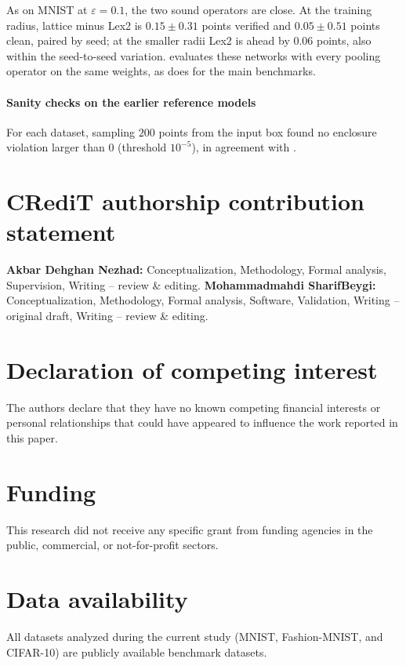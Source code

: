 \documentclass[preprint,12pt]{elsarticle}
\theoremstyle{definition}
\newcommand{\eps}{\varepsilon}
\begin{document}
As on MNIST at $\eps=0.1$, the two sound operators are close. At the training radius, lattice minus Lex2 is $0.15\pm0.31$ points verified and $0.05\pm0.51$ points clean, paired by seed; at the smaller radii Lex2 is ahead by $0.06$ points, also within the seed-to-seed variation.  evaluates these networks with every pooling operator on the same weights, as  does for the main benchmarks.



\paragraph{Sanity checks on the earlier reference models} For each dataset, sampling $200$ points from the input box found no enclosure violation larger than $0$ (threshold $10^{-5}$), in agreement with .

\section*{CRediT authorship contribution statement}
\textbf{Akbar Dehghan Nezhad:} Conceptualization, Methodology, Formal analysis, Supervision, Writing -- review \& editing.
\textbf{Mohammadmahdi SharifBeygi:} Conceptualization, Methodology, Formal analysis, Software, Validation, Writing -- original draft, Writing -- review \& editing.

\section*{Declaration of competing interest}
The authors declare that they have no known competing financial interests or personal relationships that could have appeared to influence the work reported in this paper.

\section*{Funding}
This research did not receive any specific grant from funding agencies in the public, commercial, or not-for-profit sectors.

\section*{Data availability}
All datasets analyzed during the current study (MNIST, Fashion-MNIST, and CIFAR-10) are publicly available benchmark datasets.
\end{document}
